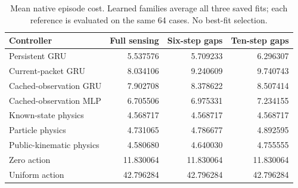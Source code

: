\documentclass[10pt,letterpaper]{article}
\begin{document}
\begin{table}[h]
\centering\small
\caption{Mean native episode cost. Learned families average all three saved fits;
each reference is evaluated on the same 64 cases. No best-fit selection.}
\begin{tabular}{lrrr}
\toprule Controller & Full sensing & Six-step gaps & Ten-step gaps\\
\midrule
Persistent GRU & 5.537576 & 5.709233 & 6.296307\\
Current-packet GRU & 8.034106 & 9.240609 & 9.740743\\
Cached-observation GRU & 7.902708 & 8.378622 & 8.507414\\
Cached-observation MLP & 6.705506 & 6.975331 & 7.234155\\
Known-state physics & 4.568717 & 4.568717 & 4.568717\\
Particle physics & 4.731065 & 4.786677 & 4.892595\\
Public-kinematic physics & 4.580680 & 4.640030 & 4.755555\\
Zero action & 11.830064 & 11.830064 & 11.830064\\
Uniform action & 42.796284 & 42.796284 & 42.796284\\
\bottomrule
\end{tabular}
\end{table}
\end{document}
